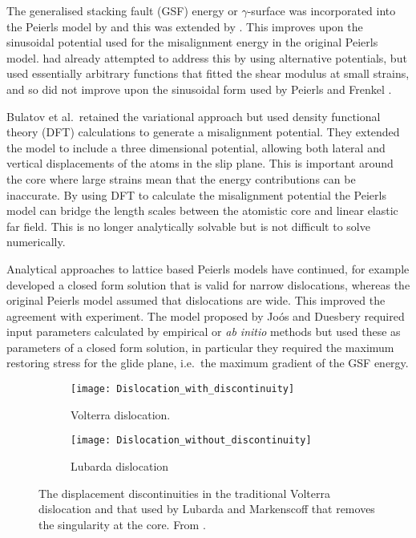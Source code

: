 


The generalised stacking fault (GSF) energy or $\gamma$-surface was incorporated into the Peierls model by \citet{Vitek1992} and this was extended by \citet{Bulatov1997}. This improves upon the sinusoidal potential used for the misalignment energy in the original Peierls model. \citet{Ohsawa1994} had already attempted to address this by using alternative potentials, but used essentially arbitrary functions that fitted the shear modulus at small strains,  and so did not improve upon the sinusoidal form used by Peierls and Frenkel \cite{Peierls1940,Frenkel1926}. 

Bulatov et al.\ retained the variational approach but used density functional theory (DFT) calculations to generate a misalignment potential. They extended the model to include a three dimensional potential, allowing both lateral and vertical displacements of the atoms in the slip plane. This is important around the core where large strains mean that the energy contributions can be inaccurate. By using DFT to calculate the misalignment potential the Peierls model can bridge the length scales between the atomistic core and linear elastic far field. This is no longer analytically solvable but is not difficult to solve numerically.

Analytical approaches to lattice based Peierls models have continued, for example \citet{Joos1997} developed a closed form solution that is valid for narrow dislocations, whereas the original Peierls model assumed that dislocations are wide. This improved the agreement with experiment. The model proposed by Jo\'{o}s and Duesbery required input parameters calculated by empirical or \emph{ab initio} methods but used these as parameters of a closed form solution, in particular they required the maximum restoring stress for the glide plane, i.e.\ the maximum gradient of the GSF energy.

\begin{figure}
\centering
\begin{subfigure}{0.4\textwidth}
\centering
\texttt{[image: Dislocation\_with\_discontinuity]}
\caption{Volterra dislocation.\label{fig:disloc_discontinuity}}
\end{subfigure}%
\begin{subfigure}{0.4\textwidth}
\centering
\texttt{[image: Dislocation\_without\_discontinuity]}
\caption{Lubarda dislocation\label{fig:disloc_no_discontinuity}}
\end{subfigure}
\captionsetup{width=0.8\textwidth}
\caption[Volterra and Lubarda dislocations.]{The displacement discontinuities in the traditional Volterra dislocation and that used by Lubarda and Markenscoff that removes the singularity at the core. From \cite{Lubarda2007}.\label{fig:discontinuity}}
\end{figure}

